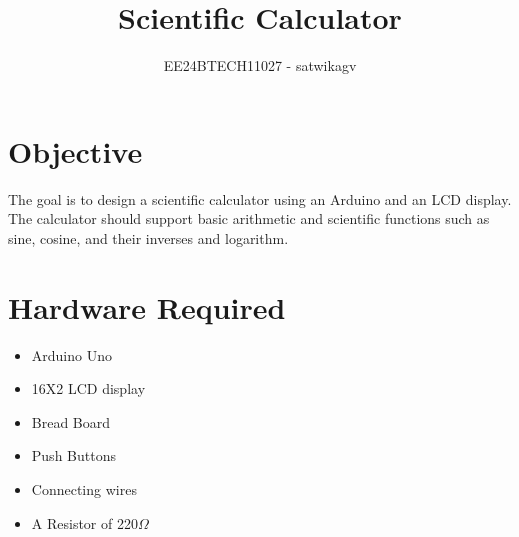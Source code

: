 \documentclass[journal]{IEEEtran}
\begin{document}

\vspace{3cm}

\title{Scientific Calculator}
\author{EE24BTECH11027 - satwikagv}
{\let\newpage\relax\maketitle}

\renewcommand{\thefigure}{\theenumi}
\renewcommand{\thetable}{\theenumi}
\setlength{\intextsep}{10pt} %


\renewcommand{\thetable}{\theenumi}

\section*{\textbf{Objective}}
The goal is to design a scientific calculator using an Arduino and an LCD display. The calculator should support basic arithmetic and scientific functions such as sine, cosine, and their inverses and logarithm.
\section*{\textbf{Hardware Required}}
\begin{itemize}
    \item Arduino Uno
    \item 16X2 LCD display
    \item Bread Board 
    \item Push Buttons
    \item Connecting wires
    \item A Resistor of 220$\Omega$
\end{itemize}
\end{document}
